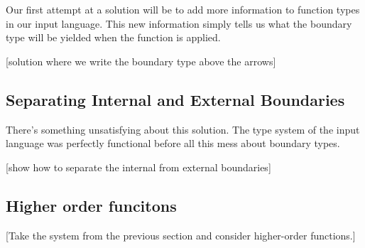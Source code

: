 \documentclass[]{article}
\begin{document}
\begin{abstrsyn}
Our first attempt at a solution will be to add more information to function types in our input language.
This new information simply tells us what the boundary type will be yielded when the function is applied.

[solution where we write the boundary type above the arrows]

\subsection{Separating Internal and External Boundaries}

There's something unsatisfying about this solution. 
The type system of the input language was perfectly functional before all this mess about boundary types.

[show how to separate the internal from external boundaries]

\subsection{Higher order funcitons}

[Take the system from the previous section and consider higher-order functions.]





\end{abstrsyn}
\end{document}
